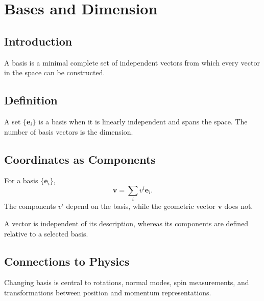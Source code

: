 \section{Bases and Dimension}
\label{sec:bases-dimension}
\subsection{Introduction}
A basis is a minimal complete set of independent vectors from which every vector in the space can be constructed.
\subsection{Definition}
A set $\{\mathbf e_i\}$ is a basis when it is linearly independent and spans the space. The number of basis vectors is the dimension.
\subsection{Coordinates as Components}
For a basis $\{\mathbf e_i\}$,
\[
\mathbf v=\sum_i v^i\mathbf e_i.
\]
The components $v^i$ depend on the basis, while the geometric vector $\mathbf v$ does not.
\begin{bookfigure}{A vector is independent of its description, whereas its components are defined relative to a selected basis.}

\label{fig:basis-vectors-new}
\end{bookfigure}

\subsection{Connections to Physics}
Changing basis is central to rotations, normal modes, spin measurements, and transformations between position and momentum representations.
